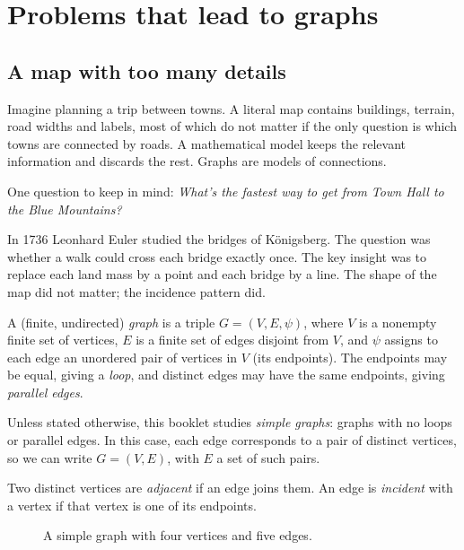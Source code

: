 \chapter{Problems that lead to graphs}
\section*{A map with too many details}
Imagine planning a trip between towns. A literal map contains buildings, terrain, road widths and labels, most of which do not matter if the only question is which towns are connected by roads. A mathematical model keeps the relevant information and discards the rest. Graphs are models of connections.

One question to keep in mind: \emph{What's the fastest way to get from Town Hall to the Blue Mountains?}

In 1736 Leonhard Euler studied the bridges of Königsberg. The question was whether a walk could cross each bridge exactly once. The key insight was to replace each land mass by a point and each bridge by a line. The shape of the map did not matter; the incidence pattern did.

\begin{definition}
A (finite, undirected) \emph{graph} is a triple $G=(V,E,\psi)$, where $V$ is a nonempty finite set of vertices, $E$ is a finite set of edges disjoint from $V$, and $\psi$ assigns to each edge an unordered pair of vertices in $V$ (its endpoints). The endpoints may be equal, giving a \emph{loop}, and distinct edges may have the same endpoints, giving \emph{parallel edges}.
\end{definition}

Unless stated otherwise, this booklet studies \emph{simple graphs}: graphs with no loops or parallel edges. In this case, each edge corresponds to a pair of distinct vertices, so we can write $G=(V,E)$, with $E$ a set of such pairs.

Two distinct vertices are \emph{adjacent} if an edge joins them. An edge is \emph{incident} with a vertex if that vertex is one of its endpoints.

\begin{figure}[h]
\centering
{}
\caption{A simple graph with four vertices and five edges.}
\end{figure}


